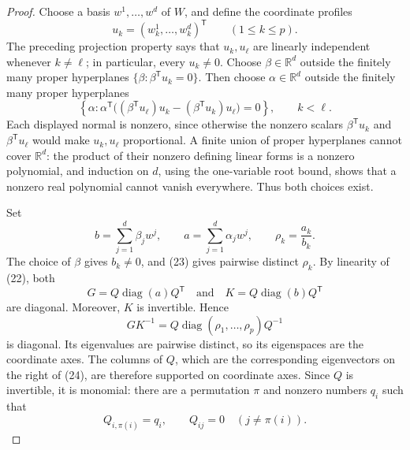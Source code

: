\documentclass{article}
\begin{document}
\begin{proof}
Choose a basis \(w^1,\ldots,w^d\) of \(W\), and define the coordinate profiles
\[
u_k=(w^1_k,\ldots,w^d_k)^{\mathsf T}
\qquad(1\leq k\leq p).
\]
The preceding projection property says that \(u_k,u_\ell\) are linearly independent whenever \(k\ne\ell\); in particular, every \(u_k\ne0\). Choose \(\beta\in\mathbb R^d\) outside the finitely many proper hyperplanes \(\{\beta:\beta^{\mathsf T}u_k=0\}\). Then choose \(\alpha\in\mathbb R^d\) outside the finitely many proper hyperplanes
\[
\left\{\alpha:
\alpha^{\mathsf T}\bigl((\beta^{\mathsf T}u_\ell)u_k
-(\beta^{\mathsf T}u_k)u_\ell\bigr)=0\right\},
\qquad k<\ell.
\tag{23}
\]
Each displayed normal is nonzero, since otherwise the nonzero scalars \(\beta^{\mathsf T}u_k\) and \(\beta^{\mathsf T}u_\ell\) would make \(u_k,u_\ell\) proportional. A finite union of proper hyperplanes cannot cover \(\mathbb R^d\): the product of their nonzero defining linear forms is a nonzero polynomial, and induction on \(d\), using the one-variable root bound, shows that a nonzero real polynomial cannot vanish everywhere. Thus both choices exist.

Set
\[
b=\sum_{j=1}^d\beta_jw^j,
\qquad
a=\sum_{j=1}^d\alpha_jw^j,
\qquad
\rho_k=\frac{a_k}{b_k}.
\]
The choice of \(\beta\) gives \(b_k\ne0\), and (23) gives pairwise distinct \(\rho_k\). By linearity of (22), both
\[
G=Q\operatorname{diag}(a)Q^{\mathsf T}
\quad\text{and}\quad
K=Q\operatorname{diag}(b)Q^{\mathsf T}
\]
are diagonal. Moreover, \(K\) is invertible. Hence
\[
GK^{-1}
=Q\operatorname{diag}(\rho_1,\ldots,\rho_p)Q^{-1}
\tag{24}
\]
is diagonal. Its eigenvalues are pairwise distinct, so its eigenspaces are the coordinate axes. The columns of \(Q\), which are the corresponding eigenvectors on the right of (24), are therefore supported on coordinate axes. Since \(Q\) is invertible, it is monomial: there are a permutation \(\pi\) and nonzero numbers \(q_i\) such that
\[
Q_{i,\pi(i)}=q_i,
\qquad
Q_{ij}=0\quad(j\ne\pi(i)).
\tag{25}
\]


\end{proof}
\end{document}
